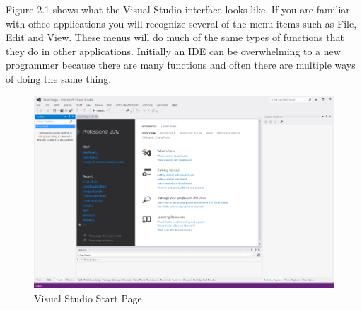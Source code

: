 Figure 2.1 shows what the Visual Studio interface looks like. If you are familiar with office applications you will recognize several of the menu items such as File, Edit and View. These menus will do much of the same types of functions that they do in other applications. Initially an IDE can be overwhelming to a new programmer because there are many functions and often there are multiple ways of doing the same thing.

\begin{figure}[tb]
  \centering
  \includegraphics[width=\textwidth]{diagrams/visual_studio_start_page.pdf}
  \caption{Visual Studio Start Page} \label{fig-if-flowchart}
\end{figure}




